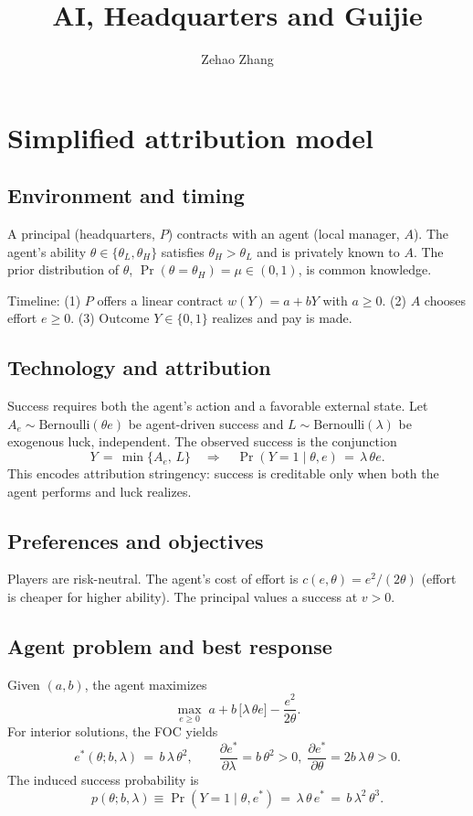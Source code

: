 \documentclass[11pt]{article}
\title{AI, Headquarters and Guijie}
\author{Zehao Zhang}
\begin{document}
\maketitle

\section*{Simplified attribution model}

\subsection*{Environment and timing}
A principal (headquarters, \(P\)) contracts with an agent (local manager, \(A\)). The agent's ability \(\theta\in\{\theta_L,\theta_H\}\) satisfies \(\theta_H>\theta_L\) and is privately known to \(A\). The prior distribution of \(\theta\), \(\Pr(\theta = \theta_H) = \mu \in (0,1)\), is common knowledge.

Timeline: (1) \(P\) offers a linear contract \(w(Y)=a+bY\) with \(a\ge 0\). (2) \(A\) chooses effort \(e\ge 0\). (3) Outcome \(Y\in\{0,1\}\) realizes and pay is made.

\subsection*{Technology and attribution}
Success requires both the agent's action and a favorable external state. Let \(A_e\sim\mathrm{Bernoulli}(\theta e)\) be agent-driven success and \(L\sim\mathrm{Bernoulli}(\lambda)\) be exogenous luck, independent. The observed success is the conjunction
\[
Y \,=\, \min\{A_e,\,L\}\quad\Longrightarrow\quad \Pr(Y=1\mid \theta,e) \,=\, \lambda\,\theta e.
\]
This encodes attribution stringency: success is creditable only when both the agent performs and luck realizes.

\subsection*{Preferences and objectives}
Players are risk-neutral. The agent's cost of effort is \(c(e,\theta)=e^2/(2\theta)\) (effort is cheaper for higher ability). The principal values a success at \(v>0\).

\subsection*{Agent problem and best response}
Given \((a,b)\), the agent maximizes
\[
\max_{e\ge 0}\; a + b\,\big[\lambda\,\theta e\big] - \frac{e^2}{2\theta}.
\]
For interior solutions, the FOC yields
\[
 e^*(\theta;b,\lambda) \,=\, b\,\lambda\,\theta^2,\qquad \frac{\partial e^*}{\partial \lambda}=b\,\theta^2>0,\; \frac{\partial e^*}{\partial \theta}=2b\,\lambda\,\theta>0.
\]
The induced success probability is
\[
 p(\theta;b,\lambda)\equiv \Pr(Y=1\mid \theta,e^*) \,=\, \lambda\,\theta\,e^* \,=\, b\,\lambda^2\,\theta^3.
\]
\end{document}
